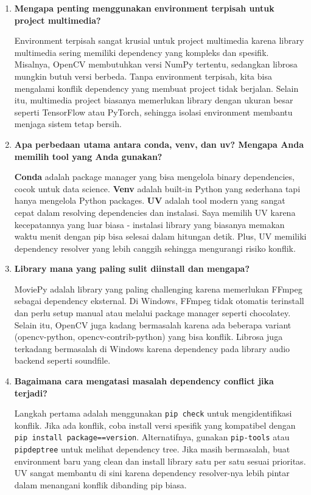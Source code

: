\documentclass[11pt,a4paper]{article}
\begin{document}
\begin{enumerate}
    \item \textbf{Mengapa penting menggunakan environment terpisah untuk project multimedia?}
    
    Environment terpisah sangat krusial untuk project multimedia karena library multimedia sering memiliki dependency yang kompleks dan spesifik. Misalnya, OpenCV membutuhkan versi NumPy tertentu, sedangkan librosa mungkin butuh versi berbeda. Tanpa environment terpisah, kita bisa mengalami konflik dependency yang membuat project tidak berjalan. Selain itu, multimedia project biasanya memerlukan library dengan ukuran besar seperti TensorFlow atau PyTorch, sehingga isolasi environment membantu menjaga sistem tetap bersih.
    
    \item \textbf{Apa perbedaan utama antara conda, venv, dan uv? Mengapa Anda memilih tool yang Anda gunakan?}
    
    \textbf{Conda} adalah package manager yang bisa mengelola binary dependencies, cocok untuk data science. \textbf{Venv} adalah built-in Python yang sederhana tapi hanya mengelola Python packages. \textbf{UV} adalah tool modern yang sangat cepat dalam resolving dependencies dan instalasi. Saya memilih UV karena kecepatannya yang luar biasa - instalasi library yang biasanya memakan waktu menit dengan pip bisa selesai dalam hitungan detik. Plus, UV memiliki dependency resolver yang lebih canggih sehingga mengurangi risiko konflik.
    
    \item \textbf{Library mana yang paling sulit diinstall dan mengapa?}
    
    MoviePy adalah library yang paling challenging karena memerlukan FFmpeg sebagai dependency eksternal. Di Windows, FFmpeg tidak otomatis terinstall dan perlu setup manual atau melalui package manager seperti chocolatey. Selain itu, OpenCV juga kadang bermasalah karena ada beberapa variant (opencv-python, opencv-contrib-python) yang bisa konflik. Librosa juga terkadang bermasalah di Windows karena dependency pada library audio backend seperti soundfile.
    
    \item \textbf{Bagaimana cara mengatasi masalah dependency conflict jika terjadi?}
    
    Langkah pertama adalah menggunakan \texttt{pip check} untuk mengidentifikasi konflik. Jika ada konflik, coba install versi spesifik yang kompatibel dengan \texttt{pip install package==version}. Alternatifnya, gunakan \texttt{pip-tools} atau \texttt{pipdeptree} untuk melihat dependency tree. Jika masih bermasalah, buat environment baru yang clean dan install library satu per satu sesuai prioritas. UV sangat membantu di sini karena dependency resolver-nya lebih pintar dalam menangani konflik dibanding pip biasa.
    

\end{enumerate}
\end{document}
